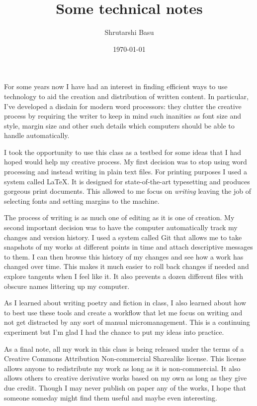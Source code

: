 \documentclass[12pt,letterpaper]{article}
\title{Some technical notes}
\author{Shrutarshi Basu}
\date{\today}
\begin{document}
\maketitle
\doublespacing

For some years now I have had an interest in finding efficient ways to use technology to aid the creation and distribution of written content. In particular, I've developed a disdain for modern word processors: they clutter the creative process by requiring the writer to keep in mind such inanities as font size and style, margin size and other such details which computers should be able to handle automatically.

I took the opportunity to use this class as a testbed for some ideas that I had hoped would help my creative process. My first decision was to stop using word processing and instead writing in plain text files. For printing purposes I used a system called \LaTeX. It is designed for state-of-the-art typesetting and produces gorgeous print documents. This allowed to me focus on \textit{writing} leaving the job of selecting fonts and setting margins to the machine.

The process of writing is as much one of editing as it is one of creation. My second important decision was to have the computer automatically track my changes and version history. I used a system called Git that allows me to take snapshots of my works at different points in time and attach descriptive messages to them. I can then browse this history of my changes and see how a work has changed over time. This makes it much easier to roll back changes if needed and explore tangents when I feel like it. It also prevents a dozen different files with obscure names littering up my computer.

As I learned about writing poetry and fiction in class, I also learned about how to best use these tools and create a workflow that let me focus on writing and not get distracted by any sort of manual micromanagement. This is a continuing experiment but I'm glad I had the chance to put my ideas into practice.

As a final note, all my work in this class is being released under the terms of a Creative Commons Attribution Non-commercial Sharealike license. This license allows anyone to redistribute my work as long as it is non-commercial. It also allows others to creative derivative works based on my own as long as they give due credit. Though I may never publish on paper any of the works, I hope that someone someday might find them useful and maybe even interesting.

\end{document}
